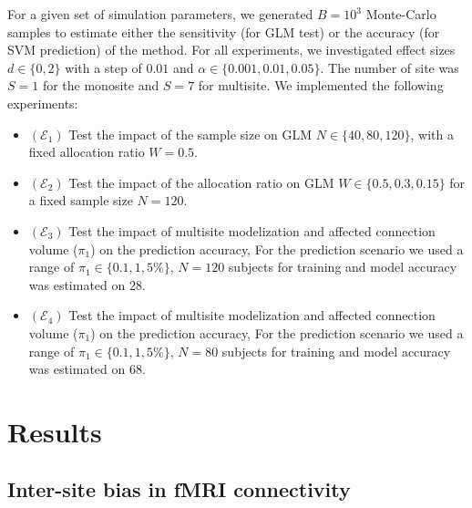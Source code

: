 \documentclass[authoryear]{elsarticle}
\begin{document}
For a given set of simulation parameters, we generated $B=10^3$ Monte-Carlo samples to estimate either the sensitivity (for GLM test) or the accuracy (for SVM prediction) of the method. For all experiments, we investigated effect sizes $d\in\{0,2\}$ with a step of $0.01$ and $\alpha\in\{0.001,0.01,0.05\}$. The number of site was $S=1$ for the monosite and $S=7$ for multisite. We implemented the following experiments:

\begin{itemize}
 \item $(\mathcal{E}_1)$ Test the impact of the sample size on GLM $N\in\{40,80,120\}$, with a fixed allocation ratio $W=0.5$.
 \item $(\mathcal{E}_2)$ Test the impact of the allocation ratio on GLM $W\in\{0.5,0.3,0.15\}$ for a fixed sample size $N=120$.
 \item $(\mathcal{E}_3)$ Test the impact of multisite modelization and affected connection volume ($\pi_1$) on the prediction accuracy, For the prediction scenario we used a range of $\pi_1\in\{0.1,1,5\%\}$, $N=120$ subjects for training and model accuracy was estimated on $28$.
  \item $(\mathcal{E}_4)$ Test the impact of multisite modelization and affected connection volume ($\pi_1$) on the prediction accuracy, For the prediction scenario we used a range of $\pi_1\in\{0.1,1,5\%\}$, $N=80$ subjects for training and model accuracy was estimated on $68$.
\end{itemize}


\section{Results}

\subsection{Inter-site bias in fMRI connectivity}
\end{document}
